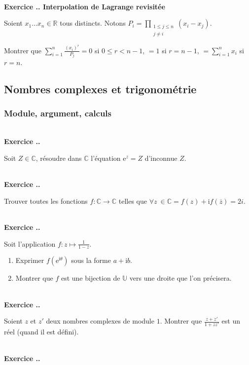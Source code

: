 \documentclass{article}
\newcommand{\mb}[1]{\mathbb{#1}}
\newcounter{exo}
\newcommand{\exercice}[1][\null]{\textbf{\\ Exercice \thesection.\theexo. #1} \addtocounter{exo}{1}}
\begin{document}
\exercice[Interpolation de Lagrange revisitée]

Soient $x_1 \dots x_n \in \mb{R}$ tous distincts. Notons $\displaystyle P_i =  \prod_{\substack{1 \le j \le n \\ j \neq i}} (x_i - x_j)$.

Montrer que $\displaystyle \sum_{i=1}^n \frac{(x_i)^r}{P_j} = 0$ si $0 \le r < n-1$,  $=1$ si $r = n-1$, $=\displaystyle \sum_{i=1}^n x_i$ si $r = n$.









\subsection{Nombres complexes et trigonométrie}



\subsubsection{Module, argument, calculs}

\exercice

Soit $Z \in \mb{C}$, résoudre dans $\mb{C}$ l'équation $\text{e}^z  = Z$ d'inconnue $Z$.


\exercice

Trouver toutes les fonctions $f : \mb{C} \rightarrow \mb{C}$ telles que $\forall z~\in \mb{C} = f(z) + \text{i} f(\overline{z}) = 2i$.

\exercice

Soit l'application $f : z \mapsto \frac{1}{1-z}$.

\begin{enumerate}

\item Exprimer $f(\text{e}^{\text{i}\theta})$ sous la forme $a + \text{i} b$.

\item Montrer que $f$ est une bijection de $\mb{U}$ vers une droite que l'on précisera.

\end{enumerate}




\exercice

Soient $z$ et $z'$ deux nombres complexes de module $1$. Montrer que $\displaystyle \frac{z+z'}{1+zz'}$ est un réel (quand il est défini).



\exercice
\end{document}
